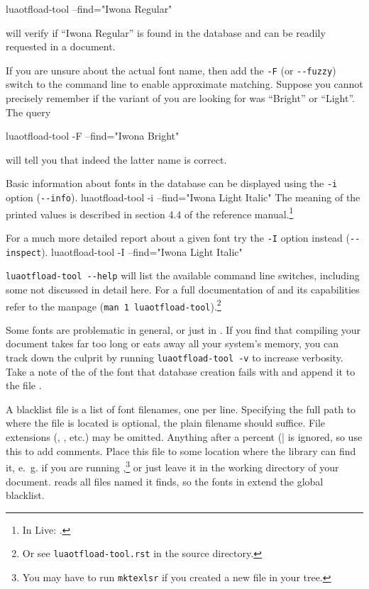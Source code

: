 \beginlisting
	luaotfload-tool  --find="Iwona Regular"
\endlisting

\noindent
will verify if “Iwona Regular” is found in the database and can be
readily requested in a document.

If you are unsure about the actual font name, then add the
\verb|-F| (or \verb|--fuzzy|) switch to the command line to enable
approximate matching.
%
Suppose you cannot precisely remember if the variant of
 you are looking for was “Bright” or “Light”.
The query

\beginlisting
	luaotfload-tool  -F --find="Iwona Bright"
\endlisting

\noindent
will tell you that indeed the latter name is correct.

Basic information about fonts in the database can be displayed
using the \verb|-i| option (\verb|--info|).
%
\beginlisting
	luaotfload-tool  -i --find="Iwona Light Italic"
\endlisting
%
\noindent
The meaning of the printed values is described in section 4.4 of the
\LUATEX reference manual.\footnote{%
  In \TEX Live: .
}

For a much more detailed report about a given font try the \verb|-I| option
instead (\verb|--inspect|).
\beginlisting
	luaotfload-tool  -I --find="Iwona Light Italic"
\endlisting

\verb|luaotfload-tool --help| will list the available command line
switches, including some not discussed in detail here.
%
For a full documentation of  and its
capabilities refer to the manpage
(\verb|man 1 luaotfload-tool|).\footnote{%
  Or see \verb|luaotfload-tool.rst| in the source directory.
}

\endsubsection

\label{font-blacklist}

Some fonts are problematic in general, or just in \LUATEX.
%
If you find that compiling your document takes far too long or eats
away all your system’s memory, you can track down the culprit by
running \verb|luaotfload-tool -v| to increase verbosity.
%
Take a note of the  of the font that database
creation fails with and append it to the file
.

A blacklist file is a list of font filenames, one per line.
Specifying the full path to where the file is located is optional, the
plain filename should suffice.
%
File extensions (, , etc.) may be omitted.
%
Anything after a percent (|%
is ignored, so use this to add comments.
%
Place this file to some location where the 
library can find it, e.~g.
 if you are running
,\footnote{%
  You may have to run \verb|mktexlsr| if you created a new file in
  your  tree.
}
or just leave it in the working directory of your document.
%
 reads all files named
 it finds, so the fonts in
 extend the global blacklist.


